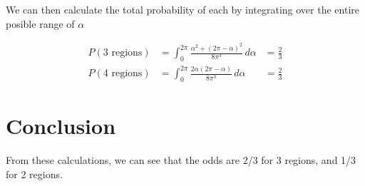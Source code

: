 \documentclass[twocolumn]{article}
\begin{document}
We can then calculate the total probability of each by integrating over the entire posible range of $\alpha$

\begin{align}
    P(3\text{ regions}) &= \int_0^{2\pi} \frac{\alpha^2 + (2\pi-\alpha)^2}
        {8\pi^3} \,d\alpha &= \frac{2}{3} \\
    P(4\text{ regions}) &= \int_0^{2\pi} \frac{2\alpha(2\pi-\alpha)}
        {8\pi^3} \,d\alpha &= \frac{2}{3}
\end{align}

\section{Conclusion}

From these calculations, we can see that the odds are 2/3 for 3 regions, and 1/3 for 2 regions.
\end{document}
